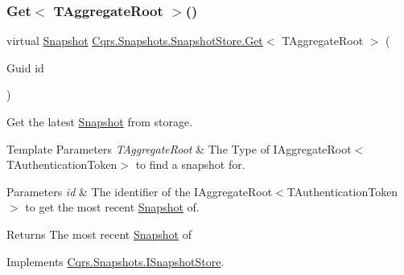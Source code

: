 \mbox{\label{classCqrs_1_1Snapshots_1_1SnapshotStore_af35423c44786c31d224d52c3796d0d3d_af35423c44786c31d224d52c3796d0d3d}} 
\subsubsection{\texorpdfstring{Get$<$ T\+Aggregate\+Root $>$()}{Get< TAggregateRoot >()}}
{\footnotesize\ttfamily virtual \hyperlink{classCqrs_1_1Snapshots_1_1Snapshot}{Snapshot} \hyperlink{classCqrs_1_1Snapshots_1_1SnapshotStore_a08ec0d8ff97742e3503a3778bb92076e_a08ec0d8ff97742e3503a3778bb92076e}{Cqrs.\+Snapshots.\+Snapshot\+Store.\+Get}$<$ T\+Aggregate\+Root $>$ (\begin{DoxyParamCaption}\item[{Guid}]{id }\end{DoxyParamCaption})\hspace{0.3cm}{\ttfamily [virtual]}}



Get the latest \hyperlink{classCqrs_1_1Snapshots_1_1Snapshot}{Snapshot} from storage. 


\begin{DoxyTemplParams}{Template Parameters}
{\em T\+Aggregate\+Root} & The Type of I\+Aggregate\+Root$<$\+T\+Authentication\+Token$>$ to find a snapshot for.\\
\hline
\end{DoxyTemplParams}

\begin{DoxyParams}{Parameters}
{\em id} & The identifier of the I\+Aggregate\+Root$<$\+T\+Authentication\+Token$>$ to get the most recent \hyperlink{classCqrs_1_1Snapshots_1_1Snapshot}{Snapshot} of.\\
\hline
\end{DoxyParams}
\begin{DoxyReturn}{Returns}
The most recent \hyperlink{classCqrs_1_1Snapshots_1_1Snapshot}{Snapshot} of
\end{DoxyReturn}


Implements \hyperlink{interfaceCqrs_1_1Snapshots_1_1ISnapshotStore_ab7bd163fc9cd5c3bd5911679030be403_ab7bd163fc9cd5c3bd5911679030be403}{Cqrs.\+Snapshots.\+I\+Snapshot\+Store}.

